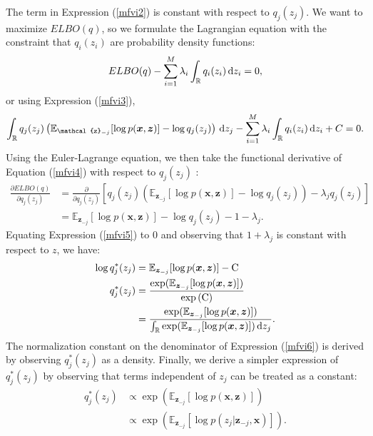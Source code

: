 \documentclass[honours,12pt, twoside]{unswthesis}
\newcommand{\R}{\mathbb{R}}
\numberwithin{equation}{section}
\theoremstyle{definition}
\begin{document}
The term in Expression (\ref{mfvi2}) is constant with respect to $q_j(z_j)$. We want to maximize $ELBO(q)$, so we formulate the Lagrangian equation with the constraint that $q_i(z_i)$ are probability density functions:
\begin{equation*}
ELBO(q)-\sum^M_{i=1}\lambda_i\int_\R q_i(z_i)\, {\rm d}z_i=0,
\end{equation*}
or using Expression (\ref{mfvi3}),
\begin{equation}
\int_\R q_j(z_j)\left(\mathbb{E}_{\mathcal{z}_{-j}}[\log p(\bm{x},\bm{z})]-\log q_j(z_j)\right)\, {\rm d}z_j-\sum^M_{i=1}\lambda_i\int_\R q_i(z_i)\, {\rm d}z_i+C=0. \label{mfvi4}
\end{equation} 
Using the Euler-Lagrange equation, we then take the functional derivative of Equation (\ref{mfvi4}) with respect to $q_j(z_j)$ \citep{pattern}:
\begin{align}
\frac{\partial ELBO(q)}{\partial q_j(z_j)}&= \frac{\partial}{\partial q_j(z_j)}\left[q_j(z_j)\left(\mathbb{E}_{\bm{z}_{-j}}[\log p(\bm{x},\bm{z})]-\log q_j(z_j)\right)-\lambda_jq_j(z_j)\right]\nonumber
\\&= \mathbb{E}_{\bm{z}_{-j}}[\log p(\bm{x},\bm{z})]-\log q_j(z_j)-1-\lambda_j.\label{mfvi5}
\end{align}
Equating Expression (\ref{mfvi5}) to 0 and observing that $1+\lambda_j$ is constant with respect to $z$, we have:
\begin{align}
\log q_j^*(z_j)&= \mathbb{E}_{\bm{z}_{-j}}[\log p(\bm{x},\bm{z})]-\text{C} \nonumber\\
q_j^*(z_j)&=\frac{\exp(\mathbb{E}_{\bm{z}_{-j}}[\log p(\bm{x},\bm{z})])}{\exp{(\text{C})}}\nonumber\\
&= \frac{\exp(\mathbb{E}_{\bm{z}_{-j}}[\log p(\bm{x},\bm{z})])}{\int_\R \exp(\mathbb{E}_{\bm{z}_{-j}}[\log p(\bm{x},\bm{z})])\, {\rm d}z_j}.\label{mfvi6}
\end{align}
The normalization constant on the denominator of Expression (\ref{mfvi6}) is derived by observing $q^*_j(z_j)$ as a density. Finally, we derive a simpler expression of $q^*_j(z_j)$ by observing that terms independent of $z_j$ can be treated as a constant:
\begin{align}
q^*_j(z_j)&\propto \exp\left(\mathbb{E}_{\bm{z}_{-j}}[\log p(\bm{x},\bm{z})]\right)\nonumber\\
&\propto \exp\left(\mathbb{E}_{\bm{z}_{-j}}[\log p(z_j|\bm{z}_{-j},\bm{x})]\right).
\end{align}
\end{document}
